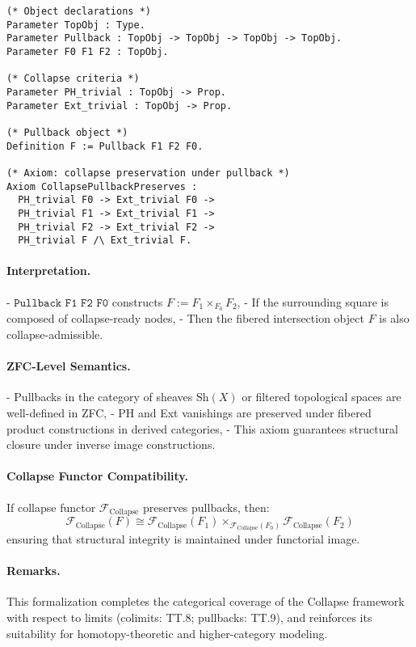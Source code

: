 \documentclass[11pt]{article}
\begin{document}
\noindent
\begin{lstlisting}[language=Coq, breaklines=true]
(* Object declarations *)
Parameter TopObj : Type.
Parameter Pullback : TopObj -> TopObj -> TopObj -> TopObj.
Parameter F0 F1 F2 : TopObj.

(* Collapse criteria *)
Parameter PH_trivial : TopObj -> Prop.
Parameter Ext_trivial : TopObj -> Prop.

(* Pullback object *)
Definition F := Pullback F1 F2 F0.

(* Axiom: collapse preservation under pullback *)
Axiom CollapsePullbackPreserves :
  PH_trivial F0 -> Ext_trivial F0 ->
  PH_trivial F1 -> Ext_trivial F1 ->
  PH_trivial F2 -> Ext_trivial F2 ->
  PH_trivial F /\ Ext_trivial F.
\end{lstlisting}

\paragraph{Interpretation.}
- \( \texttt{Pullback F1 F2 F0} \) constructs \( F := F_1 \times_{F_0} F_2 \),
- If the surrounding square is composed of collapse-ready nodes,
- Then the fibered intersection object \( F \) is also collapse-admissible.

\paragraph{ZFC-Level Semantics.}
- Pullbacks in the category of sheaves \( \mathrm{Sh}(X) \) or filtered topological spaces are well-defined in ZFC,
- PH and Ext vanishings are preserved under fibered product constructions in derived categories,
- This axiom guarantees structural closure under inverse image constructions.

\paragraph{Collapse Functor Compatibility.}
If collapse functor \( \mathcal{F}_{\text{Collapse}} \) preserves pullbacks, then:
\[
\mathcal{F}_{\text{Collapse}}(F) \cong \mathcal{F}_{\text{Collapse}}(F_1) \times_{\mathcal{F}_{\text{Collapse}}(F_0)} \mathcal{F}_{\text{Collapse}}(F_2)
\]
ensuring that structural integrity is maintained under functorial image.

\paragraph{Remarks.}
This formalization completes the categorical coverage of the Collapse framework  
with respect to limits (colimits: TT.8; pullbacks: TT.9), and reinforces its suitability for  
homotopy-theoretic and higher-category modeling.
\end{document}
